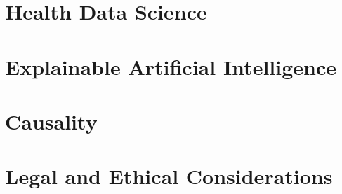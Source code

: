 \section{Health Data Science}\label{sec:heads}



\section{Explainable Artificial Intelligence}\label{sec:xai}




\section{Causality}\label{sec:causalml}




\section{Legal and Ethical Considerations}\label{sec:legalethical}


